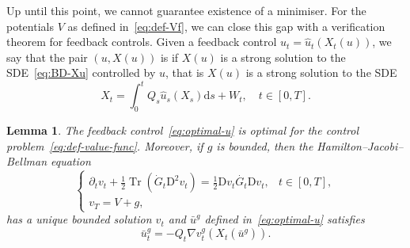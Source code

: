 \documentclass[11pt, a4paper]{scrartcl}
\numberwithin{equation}{section}
\theoremstyle{plain}
\newtheorem{lemma}[foo]{Lemma}
\theoremstyle{remark}
\newcommand{\mathD}{\mathrm{D}}
\newcommand{\mathd}{\mathrm{d}}
\newcommand{\tmop}[1]{\ensuremath{\operatorname{#1}}}
\newcommand{\tmtextit}[1]{\text{{\itshape{#1}}}}
\begin{document}
Up until this point, we cannot guarantee existence of a minimiser. For the
potentials $V$ as defined in~\eqref{eq:def-Vf}, we can close this gap with a
verification theorem for feedback controls. Given a feedback control $u_t =
\hat{u}_t (X_t (u))$, we say that the pair $(u, X (u))$ is
\tmtextit{admissible} if $X (u)$ is a strong solution to the
SDE~\eqref{eq:BD-Xu} controlled by $u$, that is $X (u)$ is a strong solution
to the SDE
\[ X_t = \int_0^t Q_s  \hat{u}_s (X_s) \mathd s + W_t, \quad t \in [0, T] . \]
\begin{lemma}
  \label{lem:verification}The feedback control~\eqref{eq:optimal-u} is optimal
  for the control problem~\eqref{eq:def-value-func}. Moreover, if $g$ is
  bounded, then the Hamilton--Jacobi--Bellman equation
  \begin{equation}
    \begin{cases}
      \partial_t v_t + \frac{1}{2} \tmop{Tr} (\dot{G}_t \mathD^2 v_t) =
      \frac{1}{2} \mathD v_t \dot{G_t} \mathD v_t, & t \in [0, T],\\
      v_T = V + g,
    \end{cases}  \label{eq:HJB}
  \end{equation}
  has a unique bounded solution $v_t$ and $\bar{u}^g$ defined
  in~\eqref{eq:optimal-u} satisfies
  \begin{equation}
    \bar{u}^g_t = - Q_t \nabla v^g_t (X_t (\bar{u}^g)) . \label{eq:u-via-HJB}
  \end{equation}
\end{lemma}
\end{document}
